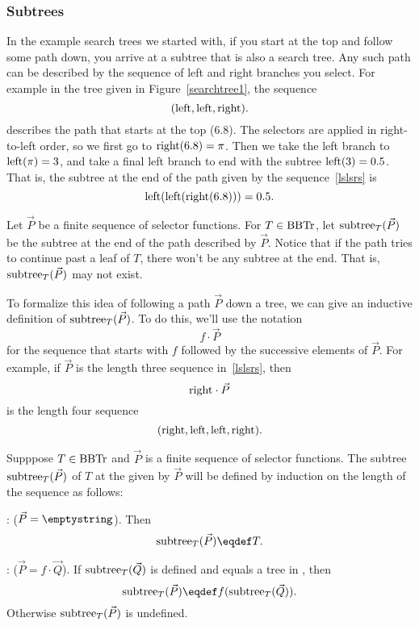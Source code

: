 \subsubsection{Subtrees}

In the example search trees we started with, if you start at the top
and follow some path down, you arrive at a subtree that is also a
search tree.  Any such path can be described by the sequence of left
and right branches you select.  For example in the tree given in
Figure~\ref{searchtree1}, the sequence
\begin{equation}\label{lslsrs}
(\text{left},\text{left},\text{right}).
\end{equation}
describes the path that starts at the top (6.8).  The selectors are
applied in right-to-left order, so we first go to $\text{right}(6.8) =
\pi$.  Then we take the left branch to $\text{left}(\pi) = 3$, and take a
final left branch to end with the subtree $\text{left}(3) = 0.5$.  That
is, the subtree at the end of the path given by the sequence~\eqref{lslsrs} is
\[
\text{left}(\text{left}(\text{right}(6.8))) = 0.5.
\]

Let $\vec{P}$ be a finite sequence of selector functions.  For $T \in
\text{BBTr}$, let $\text{subtree}_{T}(\vec{P})$ be the subtree at the end of the
path described by $\vec{P}$.  Notice that if the path tries to
continue past a leaf of $T$, there won't be any subtree at the end.
That is, $\text{subtree}_{T}(\vec{P})$ may not exist.

To formalize this idea of following a path $\vec{P}$ down a tree, we
can give an inductive definition of $\text{subtree}_{T}(\vec{P})$.  To do
this, we'll use the notation
\[
f \cdot \vec{P}
\]
for the sequence that starts with $f$ followed by the successive
elements of $\vec{P}$.  For example, if $\vec{P}$ is the length three
sequence in~\eqref{lslsrs}, then
\[
\text{right} \cdot \vec{P}
\]
is the length four sequence
\[
(\text{right}, \text{left},\text{left},\text{right}).
\]

\begin{definition}
Supppose $T \in \text{BBTr}$ and $\vec{P}$ is a finite sequence of selector
functions.  The subtree $\text{subtree}_{T}(\vec{P} )$ of $T$ at the  given by $\vec{P}$ will be defined by induction on
the length of the sequence as follows:

: ($\vec{P} = \emptystring$).
Then
\[
\rslt{T}{(\vec{P})} \eqdef T.
\]

: ($\vec{P} = f \cdot \vec{Q}$).  If
$\text{subtree}_{T}(\vec{Q})$ is defined and equals a tree in \brnchng, then
\[
\rslt{T}{(\vec{P})} \eqdef f(\rslt{T}{(\vec{Q})}).
\]
Otherwise $\text{subtree}_{T}(\vec{P})$ is undefined.
\end{definition}

